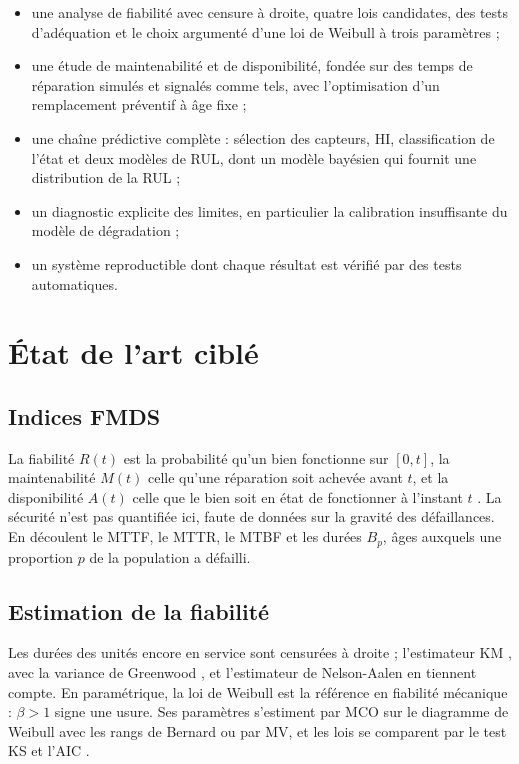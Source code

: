 \begin{itemize}
\item une analyse de fiabilité avec censure à droite, quatre lois candidates, des tests d'adéquation et le choix argumenté d'une loi de Weibull à trois paramètres ;
\item une étude de maintenabilité et de disponibilité, fondée sur des temps de réparation simulés et signalés comme tels, avec l'optimisation d'un remplacement préventif à âge fixe ;
\item une chaîne prédictive complète : sélection des capteurs, HI, classification de l'état et deux modèles de RUL, dont un modèle bayésien qui fournit une distribution de la RUL ;
\item un diagnostic explicite des limites, en particulier la calibration insuffisante du modèle de dégradation ;
\item un système reproductible dont chaque résultat est vérifié par des tests automatiques.
\end{itemize}

\section{État de l'art ciblé}\label{sec:ea}

\subsection{Indices FMDS}\label{sec:ea-fmds}

La fiabilité $R(t)$ est la probabilité qu'un bien fonctionne sur $[0, t]$, la maintenabilité $M(t)$ celle qu'une réparation soit achevée avant $t$, et la disponibilité $A(t)$ celle que le bien soit en état de fonctionner à l'instant $t$ \cite{benhmida,nf13306}. La sécurité n'est pas quantifiée ici, faute de données sur la gravité des défaillances. En découlent le MTTF, le MTTR, le MTBF et les durées $B_p$, âges auxquels une proportion $p$ de la population a défailli.

\subsection{Estimation de la fiabilité}\label{sec:ea-estimation}

Les durées des unités encore en service sont censurées à droite ; l'estimateur KM \cite{kaplanmeier1958}, avec la variance de Greenwood \cite{greenwood1926}, et l'estimateur de Nelson-Aalen \cite{nelson1972,aalen1978} en tiennent compte. En paramétrique, la loi de Weibull \cite{weibull1951} est la référence en fiabilité mécanique : $\beta > 1$ signe une usure. Ses paramètres s'estiment par MCO sur le diagramme de Weibull avec les rangs de Bernard \cite{bernard1953} ou par MV, et les lois se comparent par le test KS \cite{massey1951} et l'AIC \cite{akaike1974}.

